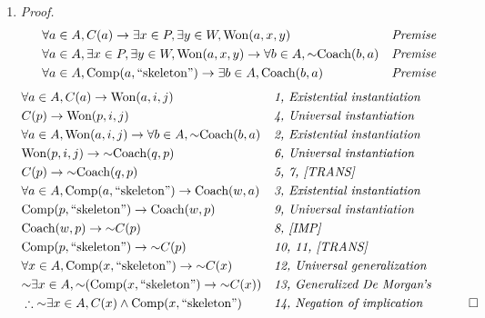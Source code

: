 \documentclass[11pt, notitlepage, leqno]{article}
\renewcommand{\neg}{\mathord{\sim}}
\begin{document}
\begin{enumerate}
\begin{enumerate}
\item \textit{Proof.} \nopagebreak \vspace{-10pt} 
\begin{align} \setcounter{equation}{0}
	& \forall a \in A, C(a) \to \exists x \in P, \exists y \in W, \textrm{\textrm{Won}}(a, x, y) && \textit{Premise} \\
	& \forall a \in A, \exists x \in P, \exists y \in W, \textrm{\textrm{Won}}(a, x, y) \to \forall b \in A, \neg \textrm{\textrm{Coach}}(b, a) && \textit{Premise} \\
	& \forall a \in A, \textrm{\textrm{Comp}}(a, \textrm{``skeleton''}) \to \exists b \in A, \textrm{\textrm{Coach}}(b, a) && \textit{Premise}
\end{align} \vspace{-33pt}
\begin{align}
	& \forall a \in A, C(a) \to \textrm{\textrm{Won}}(a, i, j) && \textit{1, Existential instantiation} \\
	& C(p) \to \textrm{Won}(p, i, j) && \textit{4, Universal instantiation} \\
	& \forall a \in A, \textrm{Won}(a, i, j) \to \forall b \in A, \neg \textrm{Coach}(b, a) && \textit{2, Existential  instantiation} \\
	& \textrm{Won}(p, i, j) \to \neg \textrm{Coach}(q, p) && \textit{6, Universal instantiation} \\
	& C(p) \to \neg \textrm{Coach}(q, p) && \textit{5, 7, [TRANS]} \\
	& \forall a \in A, \textrm{\textrm{Comp}}(a, \textrm{``skeleton''}) \to \textrm{Coach}(w, a) && \textit{3, Existential instantiation} \\
	& \textrm{Comp}(p, \textrm{``skeleton''}) \to \textrm{Coach}(w, p) && \textit{9, Universal instantiation} \\
	& \textrm{Coach}(w, p) \to \neg C(p) && \textit{8, [IMP]} \\
	& \textrm{Comp}(p, \textrm{``skeleton''}) \to \neg C(p) && \textit{10, 11, [TRANS]}\\
	& \forall x \in A, \textrm{Comp}(x, \textrm{``skeleton''}) \to \neg C(x) && \textit{12, Universal generalization} \\
	& \neg \exists x \in A, \neg (\textrm{Comp}(x, \textrm{``skeleton''}) \to \neg C(x)) && \textit{13, Generalized De Morgan's} \\
	& \therefore \neg \exists x \in A, C(x) \wedge \textrm{Comp}(x, \textrm{``skeleton''}) && \textit{14, Negation of implication} \notag & \qed
\end{align}


\end{enumerate}
\end{enumerate}
\end{document}
